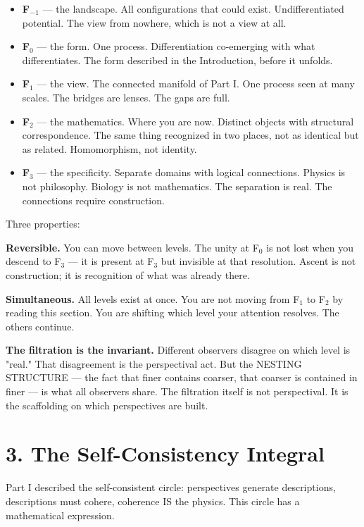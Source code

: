 \begin{itemize}[nosep,leftmargin=*]
  \item \textbf{F$_{-}$$_1$} — the landscape. All configurations that could exist. Undifferentiated potential. The view from nowhere, which is not a view at all.
  \item \textbf{F$_0$} — the form. One process. Differentiation co-emerging with what differentiates. The form described in the Introduction, before it unfolds.
  \item \textbf{F$_1$} — the view. The connected manifold of Part I. One process seen at many scales. The bridges are lenses. The gaps are full.
  \item \textbf{F$_2$} — the mathematics. Where you are now. Distinct objects with structural correspondence. The same thing recognized in two places, not as identical but as related. Homomorphism, not identity.
  \item \textbf{F$_3$} — the specificity. Separate domains with logical connections. Physics is not philosophy. Biology is not mathematics. The separation is real. The connections require construction.
\end{itemize}


Three properties:


\textbf{Reversible.} You can move between levels. The unity at F$_0$ is not lost when you descend to F$_3$ — it is present at F$_3$ but invisible at that resolution. Ascent is not construction; it is recognition of what was already there.


\textbf{Simultaneous.} All levels exist at once. You are not moving from F$_1$ to F$_2$ by reading this section. You are shifting which level your attention resolves. The others continue.


\textbf{The filtration is the invariant.} Different observers disagree on which level is "real." That disagreement is the perspectival act. But the NESTING STRUCTURE — the fact that finer contains coarser, that coarser is contained in finer — is what all observers share. The filtration itself is not perspectival. It is the scaffolding on which perspectives are built.


\section*{3. The Self-Consistency Integral}


Part I described the self-consistent circle: perspectives generate descriptions, descriptions must cohere, coherence IS the physics. This circle has a mathematical expression.


